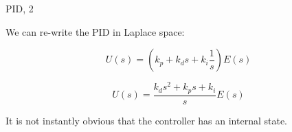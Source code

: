 \documentclass{beamer}
\begin{document}
\begin{frame}{PID, 2}
	\begin{flushleft}
		
		We can re-write the PID in Laplace space:
		
		\begin{equation}
			U(s) = \left(k_p  + k_d s + k_i \frac{1}{s} \right )E(s)
		\end{equation}
		
		\begin{equation}
			U(s) =
			\frac{k_d s^2 + k_p s + k_i }{s}E(s)
		\end{equation}
		
		It is not instantly obvious that the controller has an internal state.
		
	\end{flushleft}
\end{frame}




%		
%		
%		
\end{document}
